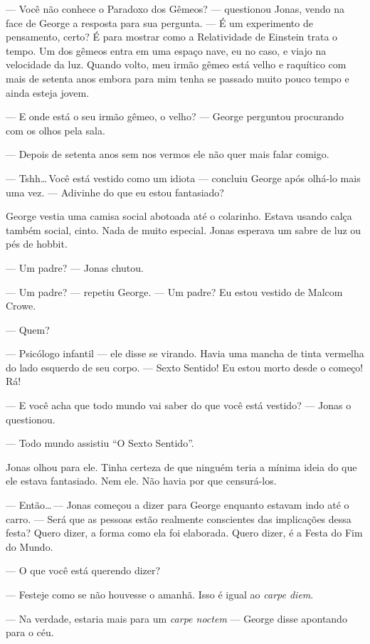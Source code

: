 --- Você não conhece o Paradoxo dos Gêmeos? --- questionou Jonas, vendo na face de George a resposta para sua pergunta. --- É um experimento de pensamento, certo? É para mostrar como a Relatividade de Einstein trata o tempo. Um dos gêmeos entra em uma espaço nave, eu\mudanca{,} no caso, e viajo na velocidade da luz. Quando volto, meu irmão gêmeo está velho e raquítico com mais de setenta anos embora para mim tenha se passado muito pouco tempo e ainda esteja jovem.

--- E onde está o seu irmão gêmeo, o velho? --- George perguntou procurando com os olhos pela sala.

--- Depois de setenta anos sem nos vermos\mudanca{,} ele não quer mais falar comigo.

--- Tshh\ldots\,Você está vestido como um idiota --- concluiu George\mudanca{,} após olhá-lo mais uma vez. --- Adivinhe do que eu estou fantasiado?

George vestia uma camisa social abotoada até o colarinho. Estava usando calça também social, cinto. Nada de muito especial. Jonas esperava um sabre de luz ou pés de hobbit.

--- Um padre? --- Jonas chutou.

--- Um padre? --- repetiu George. --- Um padre? Eu estou vestido de Malcom Crowe.

--- Quem?

--- Psicólogo infantil --- ele disse se virando. Havia uma mancha de tinta vermelha do lado esquerdo de seu corpo. --- Sexto Sentido! Eu estou morto desde o começo! Rá!

--- E você acha que todo mundo vai saber do que você está vestido? --- Jonas o questionou.

--- Todo mundo assistiu ``O Sexto Sentido''.

Jonas olhou para ele. Tinha certeza de que ninguém teria a mínima ideia do que ele estava fantasiado. Nem ele. Não havia por que censurá-los.

--- Então\ldots\,--- Jonas começou a dizer para George enquanto estavam indo até o carro. --- Será que as pessoas estão realmente conscientes das implicações dessa festa? Quero dizer, a forma como ela foi elaborada. Quero dizer, é a Festa do Fim do Mundo.

--- O que você está querendo dizer?

--- Festeje como se não houvesse o amanhã. Isso é igual ao \emph{carpe diem}.

--- Na verdade, estaria mais para um \emph{carpe noctem} --- George disse apontando para o céu.

